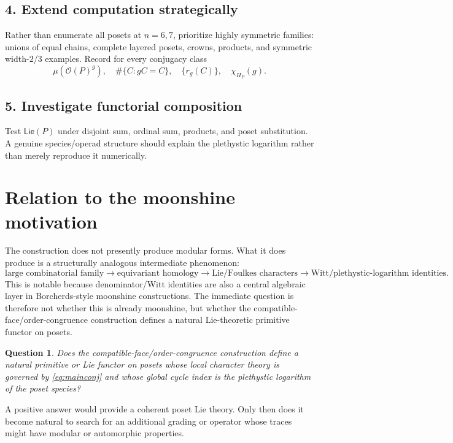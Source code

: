 \documentclass[11pt]{article}
\newtheorem{question}{Question}
\newcommand{\OP}{\mathcal O}
\begin{document}
\subsection{4. Extend computation strategically}
Rather than enumerate all posets at $n=6,7$, prioritize highly symmetric
families: unions of equal chains, complete layered posets, crowns, products,
and symmetric width-$2$/$3$ examples. Record for every conjugacy class
\[
\mu(\OP(P)^g),\quad \#\{C:gC=C\},\quad\{r_g(C)\},\quad\chi_{H_P}(g).
\]

\subsection{5. Investigate functorial composition}
Test $\mathsf{Lie}(P)$ under disjoint sum, ordinal sum, products, and poset
substitution. A genuine species/operad structure should explain the
plethystic logarithm rather than merely reproduce it numerically.

\section{Relation to the moonshine motivation}
The construction does not presently produce modular forms. What it does
produce is a structurally analogous intermediate phenomenon:
\[
\text{large combinatorial family}
\longrightarrow\text{equivariant homology}
\longrightarrow\text{Lie/Foulkes characters}
\longrightarrow\text{Witt/plethystic-logarithm identities}.
\]
This is notable because denominator/Witt identities are also a central
algebraic layer in Borcherds-style moonshine constructions. The immediate
question is therefore not whether this is already moonshine, but whether the
compatible-face/order-congruence construction defines a natural
Lie-theoretic primitive functor on posets.

\begin{question}
Does the compatible-face/order-congruence construction define a natural
primitive or Lie functor on posets whose local character theory is governed
by \eqref{eq:mainconj} and whose global cycle index is the plethystic
logarithm of the poset species?
\end{question}

A positive answer would provide a coherent poset Lie theory. Only then does
it become natural to search for an additional grading or operator whose
traces might have modular or automorphic properties.
\end{document}
